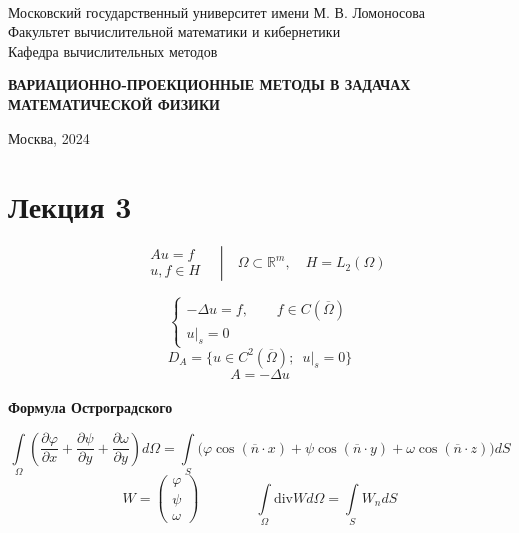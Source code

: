 \documentclass[12pt, a4paper]{article}
\begin{document}
\thispagestyle{empty}

\begin{center}
	\ \vspace{-1cm}

	{Московский государственный университет имени М. В. Ломоносова}\\
	Факультет вычислительной математики и кибернетики\\
	Кафедра вычислительных методов

	\vspace{8cm}
	\begin{spacing}{2.5}
		{\huge \bfseries ВАРИАЦИОННО-ПРОЕКЦИОННЫЕ МЕТОДЫ В ЗАДАЧАХ МАТЕМАТИЧЕСКОЙ ФИЗИКИ}
	\end{spacing}


\end{center}

\vfill

\begin{center}
	Москва, 2024
\end{center}

\enlargethispage{2\baselineskip}

\newpage

\tableofcontents

\newpage




\section{Лекция 3}

\begin{equation*}
	\left.\begin{aligned}
		&Au=f \\
		&u, f \in H
	\end{aligned}\quad \right | \quad \Omega \subset \mathbb{R}^m, \quad H = L_2(\Omega)
\end{equation*}

\[
\begin{cases}
	-\Delta u = f, \qquad f \in C(\overline{\Omega}) \\
	u |_{s} = 0
\end{cases}
\]
\[ D_A = \{u \in C^2 (\overline{\Omega}); \enspace u|_s = 0\} \]
\[ A = -\Delta u \] \\

\textbf{Формула Остроградского}

\[ \int\limits_{\Omega}\left(\frac{\partial \varphi}{\partial x } + \frac{\partial \psi }{\partial y} + \frac{\partial \omega}{\partial y}\right) d\Omega = \int\limits_{S } \biggl( \varphi \cos(\overline{n} \cdot x) + \psi \cos(\overline{n}\cdot y) + \omega \cos (\overline{n} \cdot z) \biggr) dS\]
\[ W =
\begin{pmatrix}
	\varphi \\
	\psi \\
	\omega
\end{pmatrix}
\qquad \qquad \int\limits_{\Omega}^{} \text{div} W d\Omega = \int\limits_{S}^{} W_n dS
\] \\
\end{document}
